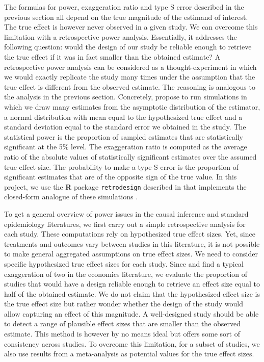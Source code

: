 \documentclass[12pt]{article}
\begin{document}
        The formulas for power, exaggeration ratio and type S error described in the previous section all depend on the true magnitude of the estimand of interest. The true effect is however never observed in a given study.  We can overcome this limitation with a retrospective power analysis. Essentially, it addresses the following question: would the design of our study be reliable enough to retrieve the true effect if it was in fact smaller than the obtained estimate? A retrospective power analysis can be considered as a thought-experiment in which we would exactly replicate the study many times under the assumption that the true effect is different from the observed estimate. The reasoning is analogous to the analysis in the previous section. Concretely, \cite{gelman_beyond_2014} propose to run simulations in which we draw many estimates from the asymptotic distribution of the estimator, a normal distribution with mean equal to the hypothesized true effect and a standard deviation equal to the standard error we obtained in the study. The statistical power is the proportion of sampled estimates that are statistically significant at the 5\% level. The exaggeration ratio is computed as the average ratio of the absolute values of statistically significant estimates over the assumed true effect size. The probability to make a type S error is the proportion of significant estimates that are of the opposite sign of the true value. In this project, we use the \textbf{\textsf{R}} package \texttt{retrodesign} described in \cite{timm_retrodesign_2019} that implements the closed-form analogue of these simulations \citep{lu_note_2019}.
    
        To get a general overview of power issues in the causal inference and standard epidemiology literatures, we first carry out a simple retrospective analysis for each study. These computations rely on hypothesized true effect sizes. Yet, since treatments and outcomes vary between studies in this literature, it is not possible to make general aggregated assumptions on true effect sizes. We need to consider specific hypothesized true effect sizes for each study. Since \cite{ioannidis_power_2017} and \cite{ferraro_feature_2020} find a typical exaggeration of two in the economics literature, we evaluate the proportion of studies that would have a design reliable enough to retrieve an effect size equal to half of the obtained estimate. We do not claim that the hypothesized effect size is the true effect size but rather wonder whether the design of the study would allow capturing an effect of this magnitude. A well-designed study should be able to detect a range of plausible effect sizes that are smaller than the observed estimate. This method is however by no means ideal but offers some sort of consistency across studies. To overcome this limitation, for a subset of studies, we also use results from a meta-analysis as potential values for the true effect sizes. 
\end{document}
